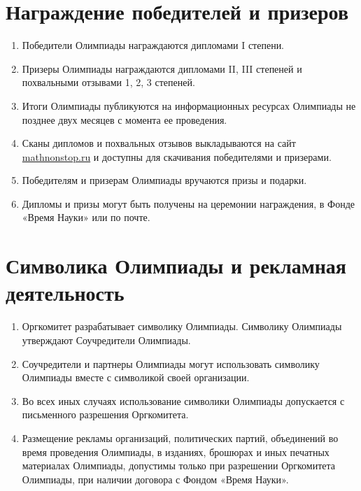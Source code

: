 \documentclass[a4paper,12pt]{article}
\newcommand{\surl}[1]{{\small\url{#1}}}
\begin{document}
\section{Награждение победителей и призеров}

\begin{enumerate}
	\item Победители Олимпиады награждаются дипломами I степени.
	\item Призеры Олимпиады награждаются дипломами II, III степеней и похвальными отзывами 1, 2, 3 степеней.
	\item Итоги Олимпиады публикуются на информационных ресурсах Олимпиады не позднее двух месяцев с момента ее проведения.
	\item Сканы дипломов и похвальных отзывов выкладываются на сайт \surl{mathnonstop.ru} и доступны для скачивания победителями и призерами.
	\item Победителям и призерам Олимпиады вручаются призы и подарки.
	\item Дипломы и призы могут быть получены на церемонии награждения, в Фонде «Время Науки» или по почте.
\end{enumerate}

\section{Символика Олимпиады и рекламная деятельность}

\begin{enumerate}
	\item Оргкомитет разрабатывает символику Олимпиады. Символику
	   Олимпиады утверждают Соучредители Олимпиады.
	\item Соучредители и партнеры Олимпиады могут использовать
	   символику Олимпиады вместе с символикой своей организации.
	\item Во всех иных случаях использование символики Олимпиады
	   допускается с письменного разрешения Оргкомитета.
	\item Размещение рекламы организаций, политических партий,
	   объединений во время проведения Олимпиады, в изданиях,
	   брошюрах и иных печатных материалах Олимпиады, допустимы
	   только при разрешении Оргкомитета Олимпиады, при наличии
	   договора с Фондом «Время Науки».
\end{enumerate}
\end{document}
